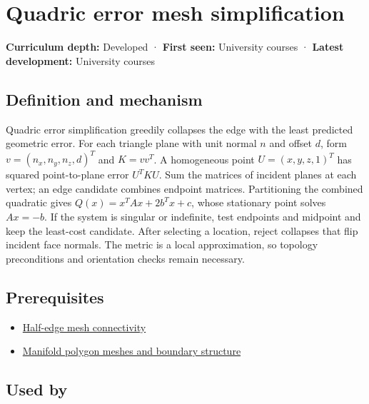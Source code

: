 \hypertarget{appendix-1dd4ad54ca57}{}\label{referencestart:appendix-1dd4ad54ca57}
\section{Quadric error mesh simplification}\label{appendix-1dd4ad54ca57-quadric-error-mesh-simplification}

\textbf{Curriculum depth:} Developed · \textbf{First seen:} University courses · \textbf{Latest development:} University courses

\subsection{Definition and mechanism}\label{appendix-1dd4ad54ca57-definition-and-mechanism}

Quadric error simplification greedily collapses the edge with the least predicted geometric error. For each triangle plane with unit normal \(n\) and offset \(d\), form \(v=(n_x,n_y,n_z,d)^T\) and \(K=vv^T\). A homogeneous point \(U=(x,y,z,1)^T\) has squared point-to-plane error \(U^TKU\). Sum the matrices of incident planes at each vertex; an edge candidate combines endpoint matrices. Partitioning the combined quadratic gives \(Q(x)=x^TAx+2b^Tx+c\), whose stationary point solves \(Ax=-b\). If the system is singular or indefinite, test endpoints and midpoint and keep the least-cost candidate. After selecting a location, reject collapses that flip incident face normals. The metric is a local approximation, so topology preconditions and orientation checks remain necessary.

\subsection{Prerequisites}\label{appendix-1dd4ad54ca57-prerequisites}

\begin{itemize}
\tightlist
\item
  \hyperref[appendix-1aea26b2307f]{Half-edge mesh connectivity}
\item
  \hyperref[appendix-fab348609369]{Manifold polygon meshes and boundary structure}
\end{itemize}

\subsection{Used by}\label{appendix-1dd4ad54ca57-used-by}

